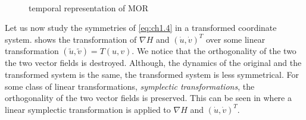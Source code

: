\begin{figure} [t]
	\begin{centering}
	 \\
	\caption{temporal representation of MOR}
	\label{fig:ch1.2}
	\end{centering}
\end{figure}


Let us now study the symmetries of \eqref{eq:ch1.4} in a transformed coordinate system.  shows the transformation of $\nabla H$ and $(\dot u, \dot v)^T$ over some linear transformation $(\tilde u, \tilde v) = T(u,v)$. We notice that the orthogonality of the two the two vector fields is destroyed. Although, the dynamics of the original and the transformed system is the same, the transformed system is less symmetrical. For some class of linear transformations, \emph{symplectic transformations}, the orthogonality of the two vector fields is preserved. This can be seen in  where a linear symplectic transformation is applied to $\nabla H$ and $(\dot u, \dot v)^T$.

